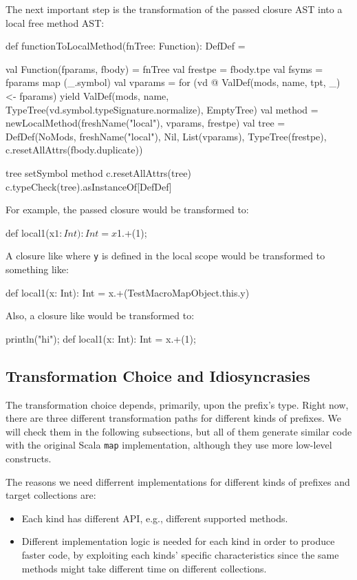The next important step is the transformation of the passed closure AST
into a local free method AST:

\begin{scalaCode}
def functionToLocalMethod(fnTree: Function): DefDef = {
  val Function(fparams, fbody) = fnTree
  val frestpe = fbody.tpe
  val fsyms   = fparams map (_.symbol)
  val vparams = for (vd @ ValDef(mods, name, tpt, _) <- fparams) yield ValDef(mods, name, TypeTree(vd.symbol.typeSignature.normalize), EmptyTree)
  val method  = newLocalMethod(freshName("local"), vparams, frestpe)
  val tree    = DefDef(NoMods, freshName("local"), Nil, List(vparams), TypeTree(frestpe), c.resetAllAttrs(fbody.duplicate))

  tree setSymbol method
  c.resetAllAttrs(tree)
  c.typeCheck(tree).asInstanceOf[DefDef]
}
\end{scalaCode}

For example, the passed closure  would be transformed to:
\begin{scalaCode}
def local1(x$1: Int): Int = x$1.+(1);
\end{scalaCode}
A closure like  where \texttt{y} is defined in the local scope would be
transformed to something like:
\begin{scalaCode}
def local1(x: Int): Int = x.+(TestMacroMapObject.this.y)
\end{scalaCode}
Also, a closure like  would be transformed to:
\begin{scalaCode}
println("hi");
def local1(x: Int): Int = x.+(1);
\end{scalaCode}

\subsection{Transformation Choice and Idiosyncrasies}

The transformation choice depends, primarily, upon the prefix's type. Right now,
there are three different transformation paths for different kinds of
prefixes. We will check them in the following subsections, but all of them generate
similar code with the original Scala \texttt{map} implementation, although they use 
more low-level constructs.

The reasons we need differrent implementations for different kinds of
prefixes and target collections are:

\begin{itemize}
 \item
  Each kind has different API, e.g., different supported methods.
 \item
  Different implementation logic is needed for each kind in order to produce
faster code, by exploiting each kinds' specific characteristics since the same
methods might take different time on different collections.
\end{itemize}

